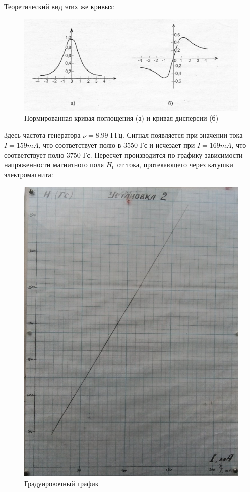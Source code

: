 \begin{center}
\begin{minipage}{0.45\linewidth}
        \vspace{-20pt}
        \label{fig:3}
      \end{minipage}
\end{center} 

Теоретический вид этих же кривых:
\begin{figure}[H]
	\centering
	\includegraphics[width=\linewidth]{fig/norm.jpg}
	\caption{Нормированная кривая поглощения (а) и кривая дисперсии (б)}
	\label{fig:5}
\end{figure}

Здесь частота генератора $\nu=8.99$ ГГц. Сигнал появляется при значении тока $I=159 mA$, что соответствует полю в 3550 Гс и исчезает при $I=169 mA$, что соответствует полю 3750 Гс. Пересчет производится по графику зависимости напряженности магнитного поля $H_0$ от тока, протекающего через катушки электромагнита:
\begin{figure}[H]
	\centering
	\includegraphics[width=0.9\linewidth]{fig/grad-3.jpg}
	\caption{Градуировочный график}
	\label{fig:6}
\end{figure}

